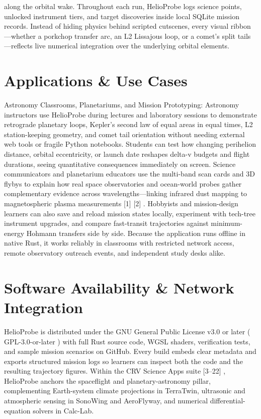 \documentclass[10pt,letterpaper]{article}
\begin{document}
along the orbital wake. Throughout each run, HelioProbe logs science points, unlocked instrument tiers, and target discoveries inside local SQLite mission records. Instead of hiding physics behind scripted cutscenes, every visual ribbon---whether a porkchop transfer arc, an L2 Lissajous loop, or a comet's split tails---reflects live numerical integration over the underlying orbital elements.

\section{Applications \& Use Cases}
Astronomy Classrooms, Planetariums, and Mission Prototyping: Astronomy instructors use HelioProbe during lectures and laboratory sessions to demonstrate retrograde planetary loops, Kepler's second law of equal areas in equal times, L2 station-keeping geometry, and comet tail orientation without needing external web tools or fragile Python notebooks. Students can test how changing perihelion distance, orbital eccentricity, or launch date reshapes delta-v budgets and flight durations, seeing quantitative consequences immediately on screen. Science communicators and planetarium educators use the multi-band scan cards and 3D flybys to explain how real space observatories and ocean-world probes gather complementary evidence across wavelengths---linking infrared dust mapping to magnetospheric plasma measurements [1] [2] . Hobbyists and mission-design learners can also save and reload mission states locally, experiment with tech-tree instrument upgrades, and compare fast-transit trajectories against minimum-energy Hohmann transfers side by side. Because the application runs offline in native Rust, it works reliably in classrooms with restricted network access, remote observatory outreach events, and independent study desks alike.

\section{Software Availability \& Network Integration}
HelioProbe is distributed under the GNU General Public License v3.0 or later ( GPL-3.0-or-later ) with full Rust source code, WGSL shaders, verification tests, and sample mission scenarios on GitHub. Every build embeds clear metadata and exports structured mission logs so learners can inspect both the code and the resulting trajectory figures. Within the CRV Science Apps suite [3--22] , HelioProbe anchors the spaceflight and planetary-astronomy pillar, complementing Earth-system climate projections in TerraTwin, ultrasonic and atmospheric sensing in SonoWing and AeroFlyway, and numerical differential-equation solvers in Calc-Lab.
\end{document}
